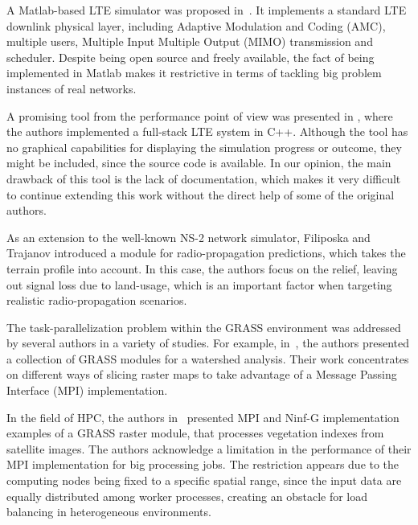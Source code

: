 A Matlab-based LTE simulator was proposed in~\cite{Mehlfuhrer_The_Vienna_LTE_Simulators_enabling_reproducibility_in_wireless_communications_research:2011}.
It implements a standard LTE downlink physical layer, including Adaptive
Modulation and Coding (AMC),
multiple users, Multiple Input Multiple Output (MIMO)
transmission and scheduler. Despite being open source and freely available,
the fact of being implemented in Matlab makes it restrictive in terms
of tackling big problem instances of real networks.

A promising tool from the performance point of view was presented
in \cite{Piro_Simulating_LTE_cellular_systems_an_open_source_framework:2011},
where the authors implemented a full-stack LTE system in C++. Although
the tool has no graphical capabilities for displaying the simulation
progress or outcome, they might be included, since the source code
is available. In our opinion, the main drawback of this tool is the
lack of documentation, which makes it very difficult to continue extending
this work without the direct help of some of the original authors.

As an extension to the well-known NS-2 network simulator, Filiposka
and Trajanov \cite{Filiposka_Terrain_aware_three_dimensional_radio_propagation_model_extension_for_NS2:2011}
introduced a module for radio-propagation predictions, which takes
the terrain profile into account. In this case, the authors focus
on the relief, leaving out signal loss due to land-usage, which is
an important factor when targeting realistic radio-propagation scenarios.

\bigskip{}


The task-parallelization problem within the GRASS environment was
addressed by several authors in a variety of studies. For example,
in~\cite{Campos_Parallel_modelling_in_GIS:2012}, the authors presented
a collection of GRASS modules for a watershed analysis. Their work
concentrates on different ways of slicing raster maps to take advantage
of a Message Passing Interface (MPI)
implementation.

In the field of HPC, the authors in~\cite{Akhter_Porting_GRASS_raster_module_to_distributed_computing:2007}
presented MPI and Ninf-G implementation examples of a GRASS raster
module, that processes vegetation indexes from satellite images. The
authors acknowledge a limitation in the performance of their MPI implementation
for big processing jobs. The restriction appears due to the computing
nodes being fixed to a specific spatial range, since the input data
are equally distributed among worker processes, creating an obstacle
for load balancing in heterogeneous environments.

